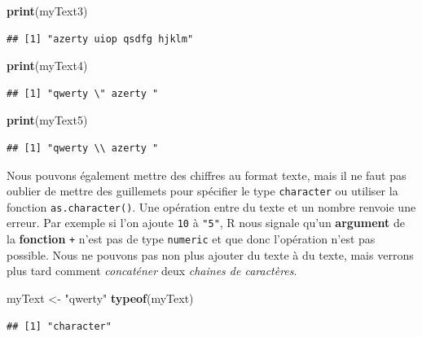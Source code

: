 \documentclass[
]{book}
\newenvironment{Shaded}{\begin{snugshade}}{\end{snugshade}}
\newcommand{\KeywordTok}[1]{\textcolor[rgb]{0.13,0.29,0.53}{\textbf{#1}}}
\newcommand{\NormalTok}[1]{#1}
\newcommand{\StringTok}[1]{\textcolor[rgb]{0.31,0.60,0.02}{#1}}
\begin{document}
\begin{Shaded}
\begin{Highlighting}[]
\KeywordTok{print}\NormalTok{(myText3)}
\end{Highlighting}
\end{Shaded}

\begin{verbatim}
## [1] "azerty uiop qsdfg hjklm"
\end{verbatim}

\begin{Shaded}
\begin{Highlighting}[]
\KeywordTok{print}\NormalTok{(myText4)}
\end{Highlighting}
\end{Shaded}

\begin{verbatim}
## [1] "qwerty \" azerty "
\end{verbatim}

\begin{Shaded}
\begin{Highlighting}[]
\KeywordTok{print}\NormalTok{(myText5)}
\end{Highlighting}
\end{Shaded}

\begin{verbatim}
## [1] "qwerty \\ azerty "
\end{verbatim}

Nous pouvons également mettre des chiffres au format texte, mais il ne faut pas oublier de mettre des guillemets pour spécifier le type \texttt{character} ou utiliser la fonction \texttt{as.character()}. Une opération entre du texte et un nombre renvoie une erreur. Par exemple si l'on ajoute \texttt{10} à \texttt{"5"}, R nous signale qu'un \textbf{argument} de la \textbf{fonction} \texttt{+} n'est pas de type \texttt{numeric} et que donc l'opération n'est pas possible. Nous ne pouvons pas non plus ajouter du texte à du texte, mais verrons plus tard comment \emph{concaténer} deux \emph{chaines de caractères}.

\begin{Shaded}
\begin{Highlighting}[]
\NormalTok{myText <-}\StringTok{ "qwerty"}
\KeywordTok{typeof}\NormalTok{(myText)}
\end{Highlighting}
\end{Shaded}

\begin{verbatim}
## [1] "character"
\end{verbatim}
\end{document}
